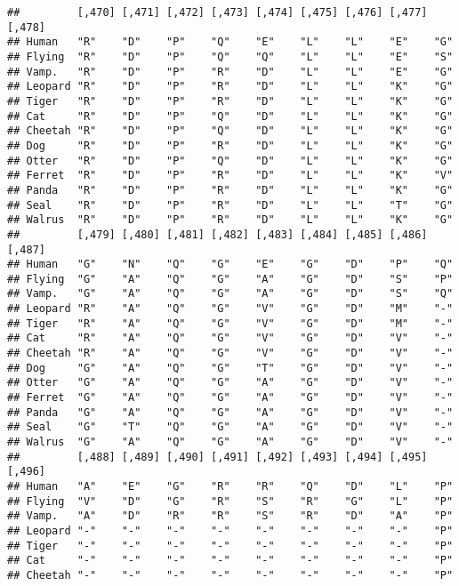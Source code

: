 \documentclass[]{article}
\begin{document}
\begin{verbatim}
##         [,470] [,471] [,472] [,473] [,474] [,475] [,476] [,477] [,478]
## Human   "R"    "D"    "P"    "Q"    "E"    "L"    "L"    "E"    "G"   
## Flying  "R"    "D"    "P"    "Q"    "Q"    "L"    "L"    "E"    "S"   
## Vamp.   "R"    "D"    "P"    "R"    "D"    "L"    "L"    "E"    "G"   
## Leopard "R"    "D"    "P"    "R"    "D"    "L"    "L"    "K"    "G"   
## Tiger   "R"    "D"    "P"    "R"    "D"    "L"    "L"    "K"    "G"   
## Cat     "R"    "D"    "P"    "Q"    "D"    "L"    "L"    "K"    "G"   
## Cheetah "R"    "D"    "P"    "Q"    "D"    "L"    "L"    "K"    "G"   
## Dog     "R"    "D"    "P"    "R"    "D"    "L"    "L"    "K"    "G"   
## Otter   "R"    "D"    "P"    "Q"    "D"    "L"    "L"    "K"    "G"   
## Ferret  "R"    "D"    "P"    "R"    "D"    "L"    "L"    "K"    "V"   
## Panda   "R"    "D"    "P"    "R"    "D"    "L"    "L"    "K"    "G"   
## Seal    "R"    "D"    "P"    "R"    "D"    "L"    "L"    "T"    "G"   
## Walrus  "R"    "D"    "P"    "R"    "D"    "L"    "L"    "K"    "G"   
##         [,479] [,480] [,481] [,482] [,483] [,484] [,485] [,486] [,487]
## Human   "G"    "N"    "Q"    "G"    "E"    "G"    "D"    "P"    "Q"   
## Flying  "G"    "A"    "Q"    "G"    "A"    "G"    "D"    "S"    "P"   
## Vamp.   "G"    "A"    "Q"    "G"    "A"    "G"    "D"    "S"    "Q"   
## Leopard "R"    "A"    "Q"    "G"    "V"    "G"    "D"    "M"    "-"   
## Tiger   "R"    "A"    "Q"    "G"    "V"    "G"    "D"    "M"    "-"   
## Cat     "R"    "A"    "Q"    "G"    "V"    "G"    "D"    "V"    "-"   
## Cheetah "R"    "A"    "Q"    "G"    "V"    "G"    "D"    "V"    "-"   
## Dog     "G"    "A"    "Q"    "G"    "T"    "G"    "D"    "V"    "-"   
## Otter   "G"    "A"    "Q"    "G"    "A"    "G"    "D"    "V"    "-"   
## Ferret  "G"    "A"    "Q"    "G"    "A"    "G"    "D"    "V"    "-"   
## Panda   "G"    "A"    "Q"    "G"    "A"    "G"    "D"    "V"    "-"   
## Seal    "G"    "T"    "Q"    "G"    "A"    "G"    "D"    "V"    "-"   
## Walrus  "G"    "A"    "Q"    "G"    "A"    "G"    "D"    "V"    "-"   
##         [,488] [,489] [,490] [,491] [,492] [,493] [,494] [,495] [,496]
## Human   "A"    "E"    "G"    "R"    "R"    "Q"    "D"    "L"    "P"   
## Flying  "V"    "D"    "G"    "R"    "S"    "R"    "G"    "L"    "P"   
## Vamp.   "A"    "D"    "R"    "R"    "S"    "R"    "D"    "A"    "P"   
## Leopard "-"    "-"    "-"    "-"    "-"    "-"    "-"    "-"    "P"   
## Tiger   "-"    "-"    "-"    "-"    "-"    "-"    "-"    "-"    "P"   
## Cat     "-"    "-"    "-"    "-"    "-"    "-"    "-"    "-"    "P"   
## Cheetah "-"    "-"    "-"    "-"    "-"    "-"    "-"    "-"    "P"   

\end{verbatim}
\end{document}
